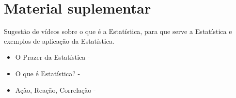 \section{Material suplementar}
\label{\detokenize{PE103-A:material-suplementar}}\label{\detokenize{PE103-A:cap-materialsuplementar-referencias}}
Sugestão de vídeos sobre o que é a Estatística, para que serve a Estatística e exemplos de aplicação da Estatística.
\begin{itemize}
\item {} 
O Prazer da Estatística - 

\item {} 
O que é Estatística? - 

\item {} 
Ação, Reação, Correlação - 

\end{itemize}

